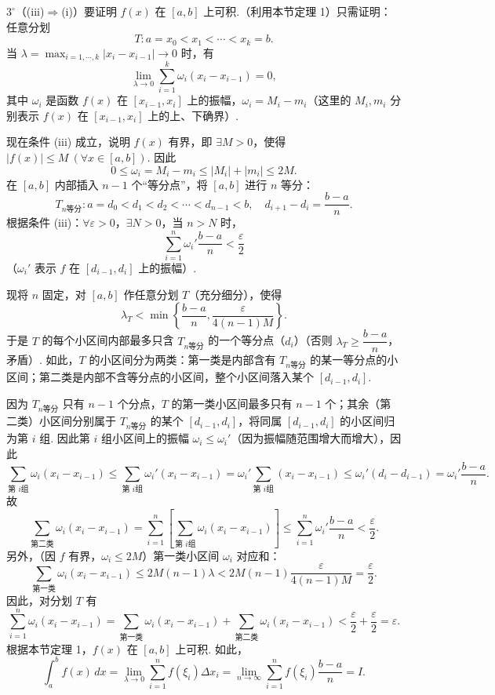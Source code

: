\documentclass[UTF8,12pt,a4paper,fontset=fandol]{ctexart}
\begin{document}
$3^\circ$（(iii)$\Rightarrow$(i)）要证明 $f(x)$ 在 $[a,b]$ 上可积.（利用本节定理 1）只需证明：任意分划
\[
T:a=x_0<x_1<\cdots<x_k=b.
\tag{1}
\]
当 $\lambda=\max_{i=1,\cdots,k}|x_i-x_{i-1}|\to0$ 时，有
\[
\lim_{\lambda\to0}\sum_{i=1}^k\omega_i(x_i-x_{i-1})=0,
\]
其中 $\omega_i$ 是函数 $f(x)$ 在 $[x_{i-1},x_i]$ 上的振幅，$\omega_i=M_i-m_i$（这里的 $M_i,m_i$ 分别表示 $f(x)$ 在 $[x_{i-1},x_i]$ 上的上、下确界）.

现在条件 (iii) 成立，说明 $f(x)$ 有界，即 $\exists M>0$，使得 $|f(x)|\le M\ (\forall x\in[a,b])$. 因此
\[
0\le\omega_i=M_i-m_i\le |M_i|+|m_i|\le2M.
\tag{2}
\]
在 $[a,b]$ 内部插入 $n-1$ 个“等分点”，将 $[a,b]$ 进行 $n$ 等分：
\[
T_{n\text{等分}}:a=d_0<d_1<d_2<\cdots<d_{n-1}<b,\quad d_{i+1}-d_i=\frac{b-a}{n}.
\]
根据条件 (iii)：$\forall\varepsilon>0$，$\exists N>0$，当 $n>N$ 时，
\[
\sum_{i=1}^n\omega_i'\frac{b-a}{n}<\frac{\varepsilon}{2}
\]
（$\omega_i'$ 表示 $f$ 在 $[d_{i-1},d_i]$ 上的振幅）.

现将 $n$ 固定，对 $[a,b]$ 作任意分划 $T$（充分细分），使得
\[
\lambda_T<\min\left\{\frac{b-a}{n},\frac{\varepsilon}{4(n-1)M}\right\}.
\]
于是 $T$ 的每个小区间内部最多只含 $T_{n\text{等分}}$ 的一个等分点（$d_i$）（否则 $\lambda_T\ge\dfrac{b-a}{n}$，矛盾）. 如此，$T$ 的小区间分为两类：第一类是内部含有 $T_{n\text{等分}}$ 的某一等分点的小区间；第二类是内部不含等分点的小区间，整个小区间落入某个 $[d_{i-1},d_i]$.

因为 $T_{n\text{等分}}$ 只有 $n-1$ 个分点，$T$ 的第一类小区间最多只有 $n-1$ 个；其余（第二类）小区间分别属于 $T_{n\text{等分}}$ 的某个 $[d_{i-1},d_i]$，将同属 $[d_{i-1},d_i]$ 的小区间归为第 $i$ 组. 因此第 $i$ 组小区间上的振幅 $\omega_i\le\omega_i'$（因为振幅随范围增大而增大），因此
\[
\sum_{\text{第 }i\text{组}}\omega_i(x_i-x_{i-1})
\le\sum_{\text{第 }i\text{组}}\omega_i'(x_i-x_{i-1})
=\omega_i'\sum_{\text{第 }i\text{组}}(x_i-x_{i-1})
\le\omega_i'(d_i-d_{i-1})=\omega_i'\frac{b-a}{n}.
\]
故
\[
\sum_{\text{第二类}}\omega_i(x_i-x_{i-1})
=\sum_{i=1}^n\left[\sum_{\text{第 }i\text{组}}\omega_i(x_i-x_{i-1})\right]
\le\sum_{i=1}^n\omega_i'\frac{b-a}{n}<\frac{\varepsilon}{2}.
\]
另外，（因 $f$ 有界，$\omega_i\le2M$）第一类小区间 $\omega_i$ 对应和：
\[
\sum_{\text{第一类}}\omega_i(x_i-x_{i-1})
\le2M(n-1)\lambda<2M(n-1)\frac{\varepsilon}{4(n-1)M}=\frac{\varepsilon}{2}.
\]
因此，对分划 $T$ 有
\[
\sum_{i=1}^n\omega_i(x_i-x_{i-1})
=\sum_{\text{第一类}}\omega_i(x_i-x_{i-1})
+\sum_{\text{第二类}}\omega_i(x_i-x_{i-1})
<\frac{\varepsilon}{2}+\frac{\varepsilon}{2}=\varepsilon.
\]
根据本节定理 1，$f(x)$ 在 $[a,b]$ 上可积. 如此，
\[
\int_a^b f(x)\,dx=\lim_{\lambda\to0}\sum_{i=1}^n f(\xi_i)\Delta x_i
=\lim_{n\to\infty}\sum_{i=1}^n f(\xi_i)\frac{b-a}{n}=I.
\]
\end{document}

